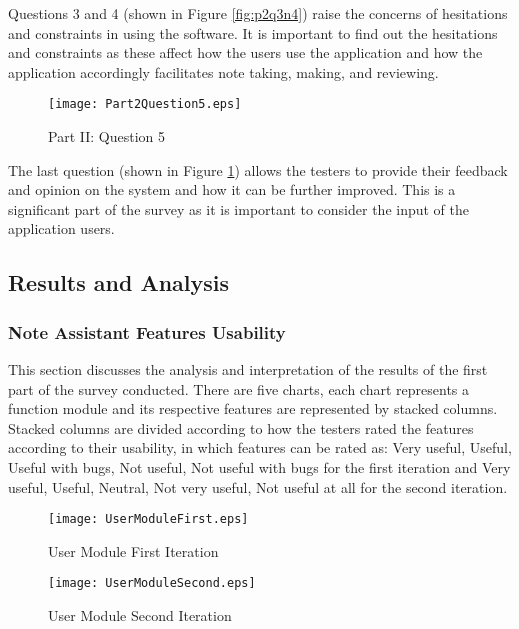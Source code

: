 Questions 3 and 4 (shown in Figure \ref{fig:p2q3n4}) raise the concerns of hesitations and constraints in using the software. It is important to find out the hesitations and constraints as these affect how the users use the application and how the application accordingly facilitates note taking, making, and reviewing.

\begin{figure}[htbp!]
   \centering
   \texttt{[image: Part2Question5.eps]} 
   \caption{Part II: Question 5}
   \label{fig:p2q5}
\end{figure}

The last question (shown in Figure \ref{fig:p2q5}) allows the testers to provide their feedback and opinion on the system and how it can be further improved. This is a significant part of the survey as it is important to consider the input of the application users.

\subsection{Results and Analysis}
\label{sec:resultsandanalysis}

\subsubsection{Note Assistant Features Usability}

This section discusses the analysis and interpretation of the results of the first part of the survey conducted. There are five charts, each chart represents a function module and its respective features are represented by stacked columns. Stacked columns are divided according to how the testers rated the features according to their usability, in which features can be rated as: Very useful, Useful, Useful with bugs, Not useful, Not useful with bugs for the first iteration and Very useful, Useful, Neutral, Not very useful, Not useful at all for the second iteration.

\begin{figure}[htbp!]
   \centering
   \texttt{[image: UserModuleFirst.eps]} 
   \caption{User Module First Iteration}
   \label{fig:usermodulefirst}
\end{figure}

\pagebreak

\begin{figure}[htbp!]
   \centering
   \texttt{[image: UserModuleSecond.eps]} 
   \caption{User Module Second Iteration}
   \label{fig:usermodulesecond}
\end{figure}


